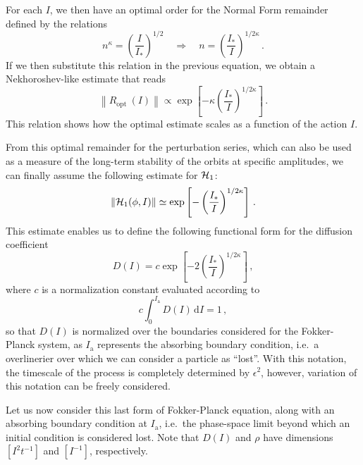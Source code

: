For each $I$, we then have an optimal order for the Normal Form remainder defined by the relations
\begin{equation}
    n^\kappa=\left(\frac{I}{I_\ast}\right)^{1 / 2} \quad \Rightarrow \quad n=\left(\frac{I_\ast}{I}\right)^{1 / 2 \kappa} \,.
\end{equation}
If we then substitute this relation in the previous equation, we obtain a Nekhoroshev-like estimate that reads
\begin{equation}
    \left\|R_{\text {opt }}(I)\right\| \propto \exp \left[-\kappa\left(\frac{I_*}{I}\right)^{1 / 2 \kappa}\right] \,.
\end{equation}
This relation shows how the optimal estimate scales as a function of the action $I$. 

From this optimal remainder for the perturbation series, which can also be used as a measure of the long-term stability of the orbits at specific amplitudes, we can finally assume the following estimate for $\mathcal{H}_1$:
\begin{equation}
    \left\|\mathcal{H}_1(\phi, I)\right\| \simeq \exp \left[-\left(\frac{I_\ast}{I}\right)^{1/2\kappa}\right] \,.
\end{equation}
This estimate enables us to define the following functional form for the diffusion coefficient
\begin{equation}
    D(I) = c \exp\left[-2\left(\frac{I_\ast}{I}\right)^{1/2\kappa}\right]\,,
    \label{eq:diffusion}
\end{equation}
where $c$ is a normalization constant evaluated according to
\begin{equation}
    c \int_0^{I_\text{a}} D(I)\,\mathrm{d}I = 1 \,,
\end{equation}
so that $D(I)$ is normalized over the boundaries considered for the Fokker-Planck system, as $I_\text{a}$ represents the absorbing boundary condition, i.e.\ a overlinerier over which we can consider a particle as ``lost''. With this notation, the timescale of the process is completely determined by $\epsilon^2$, however, variation of this notation can be freely considered.

Let us now consider this last form of Fokker-Planck equation, along with an absorbing boundary condition at $I_{\mathrm{a}}$, i.e.\ the phase-space limit beyond which an initial condition is considered lost. Note that $D(I)$ and $\rho$ have dimensions $[I^2t^{-1}]$ and $[I^{-1}]$, respectively.

